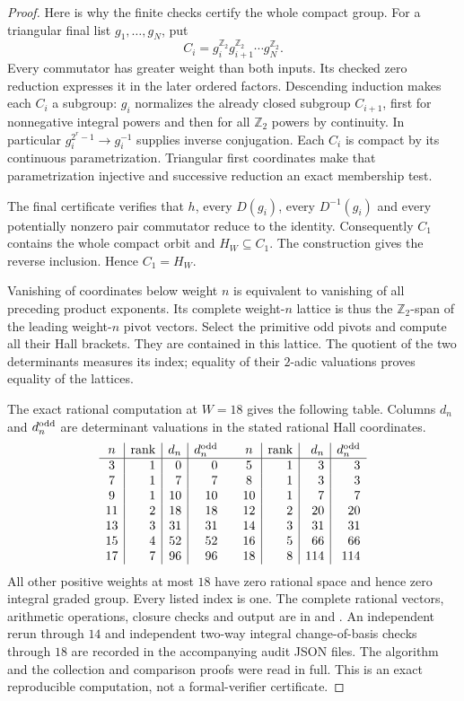 \begin{proof}
Here is why the finite checks certify the whole compact group.
For a triangular final list $g_1,\ldots,g_N$, put
\[
 C_i=g_i^{\mathbb Z_2}g_{i+1}^{\mathbb Z_2}\cdots
                         g_N^{\mathbb Z_2}.
\]
Every commutator has greater weight than both inputs. Its checked
zero reduction expresses it in the later ordered factors.
Descending induction makes each $C_i$ a subgroup: $g_i$
normalizes the already closed subgroup $C_{i+1}$, first for
nonnegative integral powers and then for all $\mathbb Z_2$
powers by continuity. In particular
$g_i^{2^r-1}\to g_i^{-1}$ supplies inverse conjugation.
Each $C_i$ is compact by its continuous parametrization.
Triangular first coordinates make that parametrization
injective and successive reduction an exact membership test.

The final certificate verifies that $h$, every $D(g_i)$,
every $D^{-1}(g_i)$ and every potentially nonzero pair
commutator reduce to the identity. Consequently $C_1$ contains
the whole compact orbit and $H_W\subseteq C_1$. The construction
gives the reverse inclusion. Hence $C_1=H_W$.

Vanishing of coordinates below weight $n$ is equivalent to
vanishing of all preceding product exponents. Its complete
weight-$n$ lattice is thus the $\mathbb Z_2$-span of the leading
weight-$n$ pivot vectors. Select the primitive odd pivots and
compute all their Hall brackets. They are contained in this
lattice. The quotient of the two determinants measures its
index; equality of their $2$-adic valuations proves equality
of the lattices.

The exact rational computation at $W=18$ gives the following
table. Columns $d_n$ and $d_n^{\rm odd}$ are determinant
valuations in the stated rational Hall coordinates.
\[
\begin{array}{c|r|r|r@{\qquad}c|r|r|r}
n&\mathrm{rank}&d_n&d_n^{\rm odd}&
n&\mathrm{rank}&d_n&d_n^{\rm odd}\\\hline
3&1&0&0&5&1&3&3\\
7&1&7&7&8&1&3&3\\
9&1&10&10&10&1&7&7\\
11&2&18&18&12&2&20&20\\
13&3&31&31&14&3&31&31\\
15&4&52&52&16&5&66&66\\
17&7&96&96&18&8&114&114
\end{array}
\]
All other positive weights at most $18$ have zero rational
space and hence zero integral graded group. Every listed index
is one. The complete rational vectors, arithmetic operations,
closure checks and output are in
 and
.
An independent rerun through $14$ and independent two-way
integral change-of-basis checks through $18$ are recorded in
the accompanying audit JSON files. The algorithm and the
collection and comparison proofs were read in full. This is
an exact reproducible computation, not a formal-verifier
certificate.
\end{proof}


